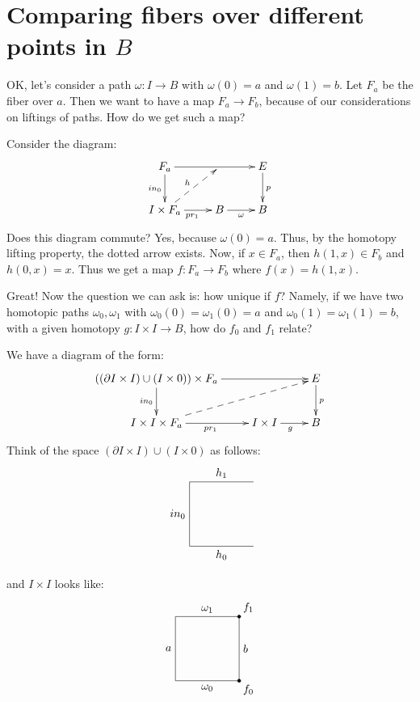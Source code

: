 \section{Comparing fibers over different points in $B$}
OK, let's consider a path $\omega:I\to B$ with $\omega(0) = a$ and $\omega(1) = b$. Let $F_a$ be the fiber over $a$. Then we want to have a map $F_a\to F_b$, because of our considerations on liftings of paths. How do we get such a map?

Consider the diagram:
\begin{equation*}
    \xymatrix{
	F_a\ar[d]_{in_0}\ar[rr] & & E\ar[d]^p\\
	I\times F_a\ar@{-->}[ur]^{h}\ar[r]_{pr_1} & B\ar[r]_{\omega} & B
    }
\end{equation*}
Does this diagram commute? Yes, because $\omega(0) = a$. Thus, by the homotopy lifting property, the dotted arrow exists. Now, if $x\in F_a$, then $h(1,x) \in F_b$ and $h(0,x) = x$. Thus we get a map $f:F_a\to F_b$ where $f(x) = h(1,x)$.

Great! Now the question we can ask is: how unique if $f$? Namely, if we have two homotopic paths $\omega_0,\omega_1$ with $\omega_0(0) = \omega_1(0) = a$ and $\omega_0(1) = \omega_1(1) = b$, with a given homotopy $g:I\times I\to B$, how do $f_0$ and $f_1$ relate?

We have a diagram of the form:
\begin{equation*}
    \xymatrix{
	((\partial I\times I)\cup (I\times 0))\times F_a\ar[d]_{in_0}\ar[rr] & & E\ar[d]^p\\
	I\times I\times F_a\ar[r]_{pr_1}\ar@{-->}[urr] & I\times I\ar[r]_g & B
    }
\end{equation*}
Think of the space $(\partial I\times I)\cup (I\times 0)$ as follows:
\begin{equation*}
\begin{tikzpicture}
    \draw (2,2) -- (0,2) -- (0,0) -- (2,0);
    \node [above] at (1,2) {$h_1$};
    \node [below] at (1,0) {$h_0$};
    \node [left] at (0,1) {$in_0$};
\end{tikzpicture}
\end{equation*}
and $I\times I$ looks like:
\begin{equation*}
    \begin{tikzpicture}
	\draw (0,0) -- (0,2) -- (2,2) -- (2,0) -- (0,0);
	\draw[fill] (2,2) circle [radius=0.05];
	\draw[fill] (2,0) circle [radius=0.05];
	\node [left] at (0,1) {$a$};
	\node [above] at (1,2) {$\omega_1$};
	\node [below] at (1,0) {$\omega_0$};
	\node [right] at (2,1) {$b$};
	\node [above right] at (2,2) {$f_1$};
	\node [below right] at (2,0) {$f_0$};
    \end{tikzpicture}
\end{equation*}

